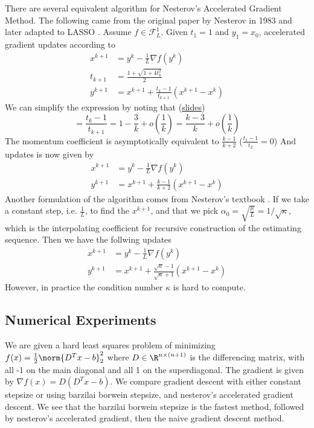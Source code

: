 \documentclass[11pt]{article}
\newcommand\scrF{\ensuremath{\mathscr{F}}}
\begin{document}
There are several equivalent algorithm for Nesterov's Accelerated Gradient Method. The following came from the original paper by Nesterov in 1983 \cite{nesterovMethodSolvingConvex1983} and later adapted to LASSO \cite{beckFastIterativeShrinkageThresholding2009a}. Assume $f\in \scrF_{L}^1$. Given $t_1 = 1$ and $y_1 = x_0$, accelerated gradient updates according to
\begin{align*}
    x^{k+1}
        &= y^k - \frac{1}{L} \nabla f(y^k) \\
    t_{k+1} 
        &= \frac{1 + \sqrt{1 + 4t_k^2} }{2} \\
    y^{k+1}
        &= x^{k+1} + \frac{t_k - 1}{t_{k+1}} \left( x^{k+1} - x^{k} \right)
\end{align*}
We can simplify the expression by noting that (\href{http://www.princeton.edu/~yc5/ele522_optimization/lectures/accelerated_gradient.pdf}{slides})
\[
        = \frac{t_k - 1}{t_{k+1}} 
        = 1 - \frac{3}{k} + o(\frac{1}{k})
        = \frac{k-3}{k} + o(\frac{1}{k})
\]
The momentum coefficient is asymptotically equivalent to $\frac{k-1}{k+2}$ ($\frac{t_1-1}{t_{2}} = 0$)
And updates is now given by
\begin{align*}  
    x^{k+1} 
        &= y^k - \frac{1}{L} \nabla f(y^k) \\
    y^{k+1}
        &= x^{k+1} + \frac{k-1}{k+2} \left( x^{k+1} - x^k \right)
\end{align*}
Another formulation of the algorithm comes from Nesterov's textbook \cite{nesterovIntroductoryLecturesConvex2004}. If we take a constant step, i.e. $\frac{1}{L}$, to find the $x^{k+1}$, and that we pick $\alpha_0 = \sqrt{\frac{\mu}{L}} = 1/\sqrt{\kappa}$, which is the interpolating coefficient for recursive construction of the estimating sequence. Then we have the follwing updates
\begin{align*}
    x^{k+1} 
        &=  y^k - \frac{1}{L} \nabla f(y^k) \\
    y^{k+1}
        &= x^{k+1} + \frac{\sqrt{\kappa} - 1}{\sqrt{\kappa} + 1} (x^{k+1} - x^k)
\end{align*}
However, in practice the condition number $\kappa$ is hard to compute.


\subsection{Numerical Experiments}

We are given a hard least squares problem of minimizing $f(x) = \frac{1}{2}\norm{D^Tx-b}_2^2$ where $D\in\R^{n\times (n+1)}$ is the differencing matrix, with all -1 on the main diagonal and all 1 on the superdiagonal. The gradient is given by $\nabla f(x) = D(D^Tx-b)$. We compare gradient descent with either constant stepsize or using barzilai borwein stepsize, and nesterov's accelerated gradient descent.
We see that the barzilai borwein stepsize is the fastest method, followed by nesterov's accelerated gradient, then the naive gradient descent method.
\end{document}
